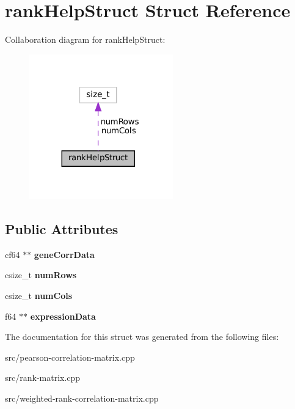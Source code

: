 \hypertarget{structrankHelpStruct}{}\section{rank\+Help\+Struct Struct Reference}
\label{structrankHelpStruct}


Collaboration diagram for rank\+Help\+Struct\+:\nopagebreak
\begin{figure}[H]
\begin{center}
\leavevmode
\includegraphics[width=176pt]{structrankHelpStruct__coll__graph}
\end{center}
\end{figure}
\subsection*{Public Attributes}
\begin{DoxyCompactItemize}
\item 
\mbox{\label{structrankHelpStruct_a992a3fb809ed89ef5ed631f671535ca8}} 
cf64 $\ast$$\ast$ {\bfseries gene\+Corr\+Data}
\item 
\mbox{\label{structrankHelpStruct_a51bf73dea1120f6bcc2e681c3fac0840}} 
csize\+\_\+t {\bfseries num\+Rows}
\item 
\mbox{\label{structrankHelpStruct_a1f20df966e9f704603296ddc4ca4860b}} 
csize\+\_\+t {\bfseries num\+Cols}
\item 
\mbox{\label{structrankHelpStruct_a2163f31046e19cb541d2108edcb12061}} 
f64 $\ast$$\ast$ {\bfseries expression\+Data}
\end{DoxyCompactItemize}


The documentation for this struct was generated from the following files\+:\begin{DoxyCompactItemize}
\item 
src/pearson-\/correlation-\/matrix.\+cpp\item 
src/rank-\/matrix.\+cpp\item 
src/weighted-\/rank-\/correlation-\/matrix.\+cpp\end{DoxyCompactItemize}
